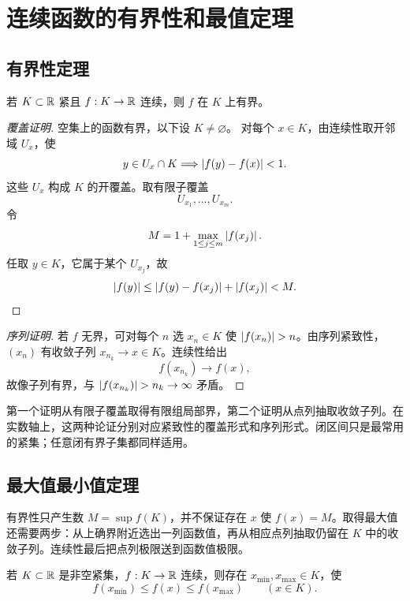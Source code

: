 \section{连续函数的有界性和最值定理}

\subsection{有界性定理}

\begin{theorem}[有界性定理]
若 \(K\subset\mathbb{R}\) 紧且 \(f:K\to\mathbb{R}\) 连续，则 \(f\) 在 \(K\) 上有界。
\end{theorem}

\begin{proof}[覆盖证明]
空集上的函数有界，以下设 \(K\ne\varnothing\)。
对每个 \(x\in K\)，由连续性取开邻域 \(U_x\)，使
\[
 y\in U_x\cap K\Longrightarrow\left|f(y)-f(x)\right|<1.
\]
这些 \(U_x\) 构成 \(K\) 的开覆盖。取有限子覆盖
\[
 U_{x_1},\ldots,U_{x_m}.
\]
令
\[
 M=1+\max_{1\le j\le m}\left|f(x_j)\right|.
\]
任取 \(y\in K\)，它属于某个 \(U_{x_j}\)，故
\[
 \left|f(y)\right|\le\left|f(y)-f(x_j)\right|+\left|f(x_j)\right|<M.
\]
\end{proof}

\begin{proof}[序列证明]
若 \(f\) 无界，可对每个 \(n\) 选 \(x_n\in K\) 使 \(\abs{f(x_n)}>n\)。由序列紧致性，\((x_n)\) 有收敛子列 \(x_{n_k}\to x\in K\)。连续性给出
\[
 f(x_{n_k})\to f(x),
\]
故像子列有界，与 \(\abs{f(x_{n_k})}>n_k\to\infty\) 矛盾。
\end{proof}

第一个证明从有限子覆盖取得有限组局部界，第二个证明从点列抽取收敛子列。在实数轴上，这两种论证分别对应紧致性的覆盖形式和序列形式。闭区间只是最常用的紧集；任意闭有界子集都同样适用。

\subsection{最大值最小值定理}

有界性只产生数 \(M=\sup f(K)\)，并不保证存在 \(x\) 使 \(f(x)=M\)。取得最大值还需要两步：从上确界附近选出一列函数值，再从相应点列抽取仍留在 \(K\) 中的收敛子列。连续性最后把点列极限送到函数值极限。

\begin{theorem}
若 \(K\subset\mathbb{R}\) 是非空紧集，\(f:K\to\mathbb{R}\) 连续，则存在 \(x_{\min},x_{\max}\in K\)，使
\[
 f(x_{\min})\le f(x)\le f(x_{\max})
 \qquad(x\in K).
\]
\end{theorem}

